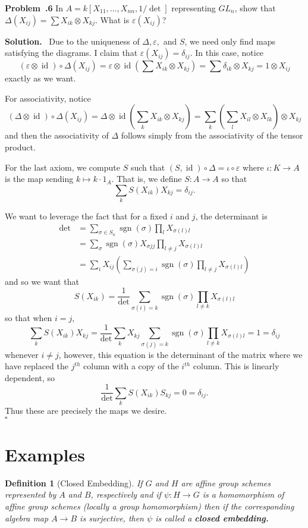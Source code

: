 \documentclass[12pt]{article}
\newtheorem{defn}[lem]{Definition}
\newenvironment{prob}[1]{\par\smallskip
	\noindent\begin{mdframed}\small \textbf{Problem~\thesection.#1} \rmfamily\quad}{\end{mdframed}\medskip}
\newenvironment{sol}{\noindent \textbf{Solution.} \,}{\\\hspace*{\fill}$\square$\medskip}
\begin{document}
\begin{prob}{6}
	In $A=k[X_{11},\dots,X_{nn},1/\operatorname{det}]$ representing $GL_n$, show that $\Delta(X_{ij})=\sum X_{ik}\otimes X_{kj}$.
	What is $\varepsilon(X_{ij})$?
\end{prob}
\begin{sol}
	Due to the uniqueness of $\Delta,\varepsilon,$ and $S$, we need only find maps satisfying 
	the diagrams. I claim that $\varepsilon(X_{ij})=\delta_{ij}$. In this case, notice
	\[(\varepsilon\otimes\operatorname{id})\circ\Delta(X_{ij})=\varepsilon\otimes\operatorname{id}\left( \sum X_{ik}\otimes X_{kj} \right)=\sum \delta_{ik}\otimes X_{kj}=1\otimes X_{ij}\]
	exactly as we want.

	For associativity, notice
	\[(\Delta\otimes \operatorname{id})\circ \Delta (X_{ij})=\Delta\otimes\operatorname{id}\left( \sum_k X_{ik}\otimes X_{kj} \right)=\sum_k\left(\sum_l X_{il}\otimes X_{lk}\right)\otimes X_{kj}\]
	and then the associativity of $\Delta$ follows simply from the associativity of the tensor product.

	For the last axiom, we compute $S$ such that $(S,\operatorname{id})\circ\Delta=\iota\circ\varepsilon$ where $\iota:K\to A$ is the map sending $k\mapsto k\cdot 1_A$.
	That is, we define $S:A\to A$ so that
	\[\sum_k S(X_{ik})X_{kj}=\delta_{ij}.\]

	We want to leverage the fact that for a fixed $i$ and $j$, the determinant is
	\begin{align*}
		\operatorname{det} &= \sum_{\sigma\in S_n}\operatorname{sgn}(\sigma)\prod_l X_{\sigma(l)l}\\
		&=\sum_\sigma \operatorname{sgn}(\sigma)X_{\sigma{j}j}\prod_{l\ne j} X_{\sigma(l)l}\\
		&=\sum_i X_{ij}\left(\sum_{\sigma(j)=i}\operatorname{sgn}(\sigma)\prod_{l\ne j}X_{\sigma(l)l}\right)
	\end{align*}
	and so we want that 
	\[S(X_{ik})=\frac{1}{\operatorname{det}}\sum_{\sigma(i)=k}\operatorname{sgn}(\sigma)\prod_{l\ne k}X_{\sigma(l)l}\]
	so that when $i=j$,
	\[\sum_k S(X_{ik})X_{kj}=\frac{1}{\operatorname{det}}\sum_k X_{kj}\sum_{\sigma(j)=k}\operatorname{sgn}(\sigma)\prod_{l\ne k}X_{\sigma(l)l}=1=\delta_{ij}\]
	whenever $i\ne j$, however, this equation is the determinant of the matrix where we have replaced
	the $j^{th}$ column with a copy of the $i^{th}$ column. This is linearly dependent, so 
	\[\frac{1}{\operatorname{det}}\sum_k S(X_{ik})S_{kj}=0=\delta_{ij}.\]
	Thus these are precisely the maps we desire.
\end{sol}

\section{Examples}
\begin{defn}[Closed Embedding]
	If $G$ and $H$ are affine group schemes represented by $A$ and $B$, respectively and
	if $\psi:H\to G$ is a homomorphism of affine group schemes (locally a group homomorphism)
	then if the corresponding algebra map $A\to B$ is surjective, then $\psi$ is called
	a \textbf{closed embedding.}
\end{defn}
\end{document}

